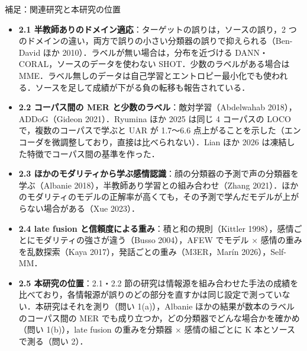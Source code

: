 \begin{frame}{補足：関連研究と本研究の位置}
\scriptsize
\begin{itemize}\setlength\itemsep{1pt}
\item \textbf{2.1 半教師ありのドメイン適応}：ターゲットの誤りは，ソースの誤り，2 つのドメインの違い，両方で誤りの小さい分類器の誤りで抑えられる（Ben-David ほか 2010）．ラベルが無い場合は，分布を近づける DANN・CORAL，ソースのデータを使わない SHOT．少数のラベルがある場合は MME．ラベル無しのデータは自己学習とエントロピー最小化でも使われる．ソースを足して成績が下がる負の転移も報告されている．
\item \textbf{2.2 コーパス間の MER と少数のラベル}：敵対学習（Abdelwahab 2018），ADDoG（Gideon 2021）．Ryumina ほか 2025 は同じ 4 コーパスの LOCO で，複数のコーパスで学ぶと UAR が 1.7〜6.6 点上がることを示した（エンコーダを微調整しており，直接は比べられない）．Lian ほか 2026 は凍結した特徴でコーパス間の基準を作った．
\item \textbf{2.3 ほかのモダリティから学ぶ感情認識}：顔の分類器の予測で声の分類器を学ぶ（Albanie 2018），半教師あり学習との組み合わせ（Zhang 2021）．ほかのモダリティのモデルの正解率が高くても，その予測で学んだモデルが上がらない場合がある（Xue 2023）．
\item \textbf{2.4 late fusion と信頼度による重み}：積と和の規則（Kittler 1998），感情ごとにモダリティの強さが違う（Busso 2004），AFEW でモデル × 感情の重みを乱数探索（Kaya 2017），発話ごとの重み（M3ER，Marín 2026），Self-MM．
\item \textbf{2.5 本研究の位置}：2.1・2.2 節の研究は情報源を組み合わせた手法の成績を比べており，各情報源が誤りのどの部分を直すかは同じ設定で測っていない．本研究はそれを測り（問い 1(a)），Albanie ほかの結果が数本のラベルのコーパス間の MER でも成り立つか，どの分類器でどんな場合かを確かめ（問い 1(b)），late fusion の重みを分類器 × 感情の組ごとに K 本とソースで測る（問い 2）．
\end{itemize}
\end{frame}

